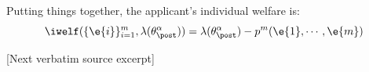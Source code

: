 \documentclass[10pt]{article}
\begin{document}
\begin{ReviewVerbatim}

Putting things together, the applicant's individual welfare is:
\begin{equation*}
\iwelf(\{ \e{i} \}_{i=1}^m, \lambda(\theta_\post^\alpha)) = \lambda(\theta_\post^\alpha) - p^m( \e{1}, \cdots, \e{m})
\end{equation*}

[Next verbatim source excerpt]


\end{ReviewVerbatim}
\end{document}

